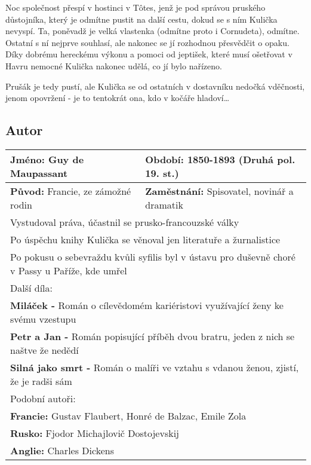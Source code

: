         Noc společnost přespí v hostinci v Tôtes, jenž je pod správou pruského důstojníka, který je odmítne pustit na další cestu, dokud se s ním Kulička nevyspí.
        Ta, poněvadž je velká vlastenka (odmítne proto i Cornudeta), odmítne.
        Ostatní s ní nejprve souhlasí, ale nakonec se jí rozhodnou přesvědčit o opaku.
        Díky dobrému hereckému výkonu a pomoci od jeptišek, které musí ošetřovat v Havru nemocné Kulička nakonec udělá, co jí bylo nařízeno.

        Prušák je tedy pustí, ale Kulička se od ostatních v dostavníku nedočká vděčnosti, jenom opovržení - je to tentokrát ona, kdo v kočáře hladoví…
    \subsection*{Autor}
        \begin{center}
            \begin{tabular}{l|l}
                \textbf{Jméno:} Guy de Maupassant & \textbf{Období:} 1850-1893 (Druhá pol. 19. st.)\\
                \hline
                \textbf{Původ:} Francie, ze zámožné rodin & \textbf{Zaměstnání:} Spisovatel, novinář a dramatik\\
                \hline
                \multicolumn{2}{l}{Vystudoval práva, účastnil se prusko-francouzské války} \\
                \multicolumn{2}{l}{Po úspěchu knihy Kulička se věnoval jen literatuře a žurnalistice} \\
                \multicolumn{2}{l}{Po pokusu o sebevraždu kvůli syfilis byl v ústavu pro duševně choré v Passy u Paříže, kde umřel} \\
                \hline
                \multicolumn{2}{l}{Další díla:} \\
                \multicolumn{2}{l}{\textbf{Miláček -} Román o cílevědomém kariéristovi využívající ženy ke svému vzestupu} \\
                \multicolumn{2}{l}{\textbf{Petr a Jan -} Román popisující příběh dvou bratru, jeden z nich se naštve že nedědí} \\
                \multicolumn{2}{l}{\textbf{Silná jako smrt -} Román o malíři ve vztahu s vdanou ženou, zjistí, že je radši sám} \\
                \hline
                \multicolumn{2}{l}{Podobní autoři:} \\
                \multicolumn{2}{l}{\textbf{Francie:} Gustav Flaubert, Honré de Balzac, Emile Zola} \\
                \multicolumn{2}{l}{\textbf{Rusko:} Fjodor Michajlovič Dostojevskij} \\
                \multicolumn{2}{l}{\textbf{Anglie:} Charles Dickens} \\
            \end{tabular}
        \end{center}